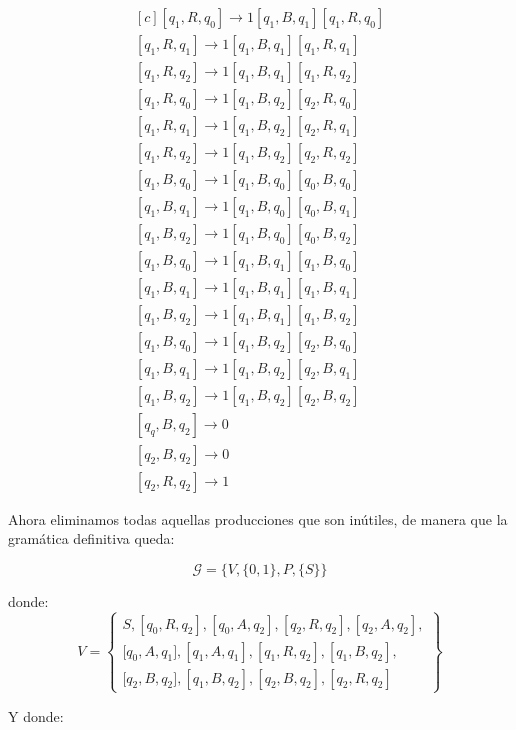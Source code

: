 \documentclass[11pt,a4paper]{article}
\begin{document}
\begin{equation*}
\begin{aligned}[c]
	  [q_1,R,q_0]\rightarrow 1[q_1,B,q_1][q_1,R,q_0]\\
	  [q_1,R,q_1]\rightarrow 1[q_1,B,q_1][q_1,R,q_1]\\
	  [q_1,R,q_2]\rightarrow 1[q_1,B,q_1][q_1,R,q_2]\\
	  [q_1,R,q_0]\rightarrow 1[q_1,B,q_2][q_2,R,q_0]\\
	  [q_1,R,q_1]\rightarrow 1[q_1,B,q_2][q_2,R,q_1]\\
	  [q_1,R,q_2]\rightarrow 1[q_1,B,q_2][q_2,R,q_2]\\
	  [q_1,B,q_0]\rightarrow 1[q_1,B,q_0][q_0,B,q_0]\\
	  [q_1,B,q_1]\rightarrow 1[q_1,B,q_0][q_0,B,q_1]\\
	  [q_1,B,q_2]\rightarrow 1[q_1,B,q_0][q_0,B,q_2]\\
	  [q_1,B,q_0]\rightarrow 1[q_1,B,q_1][q_1,B,q_0]\\
	  [q_1,B,q_1]\rightarrow 1[q_1,B,q_1][q_1,B,q_1]\\
	  [q_1,B,q_2]\rightarrow 1[q_1,B,q_1][q_1,B,q_2]\\
	  [q_1,B,q_0]\rightarrow 1[q_1,B,q_2][q_2,B,q_0]\\
	  [q_1,B,q_1]\rightarrow 1[q_1,B,q_2][q_2,B,q_1]\\
	  [q_1,B,q_2]\rightarrow 1[q_1,B,q_2][q_2,B,q_2]\\
	  [q_q,B,q_2]\rightarrow 0 \qquad \qquad \qquad \qquad \\
	  [q_2,B,q_2]\rightarrow 0 \qquad \qquad \qquad \qquad \\
	  [q_2,R,q_2]\rightarrow 1 \qquad \qquad \qquad \qquad
	\end{aligned}
	\end{equation*}
	
Ahora eliminamos todas aquellas producciones que son inútiles, de manera que la gramática definitiva queda:

\[\mathcal{G}=\{V,\{0,1\},P,\{S\}\}\]

donde:
	\[V=\left\{\begin{array}{c}
	  			S,[q_0,R,q_2],[q_0,A,q_2],[q_2,R,q_2],[q_2,A,q_2], \\
	  			\lbrack q_0,A,q_1],[q_1,A,q_1],[q_1,R,q_2],[q_1,B,q_2],\\
	  			\lbrack q_2,B,q_2], [q_1,B,q_2],[q_2,B,q_2],[q_2,R,q_2]
	  		\end{array}\right\}\]
	  		
Y donde:
\end{document}
